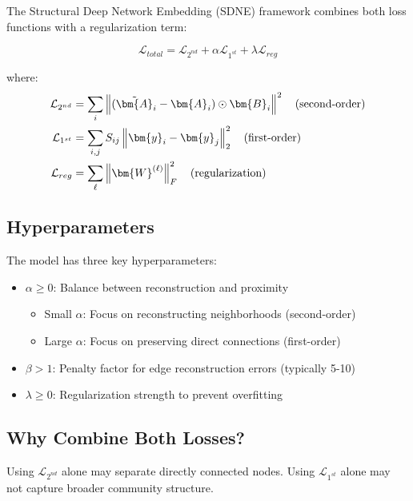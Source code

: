 \begin{notechapter}
The Structural Deep Network Embedding (SDNE) framework combines both loss functions with a regularization term:

\begin{equation}
\mathcal{L}_{total} = \mathcal{L}_{2^{nd}} + \alpha \mathcal{L}_{1^{st}} + \lambda \mathcal{L}_{reg}
\label{graph-autoencoders:eq:total_loss}
\end{equation}

where:
\begin{align}
\mathcal{L}_{2^{nd}} &= \sum_{i} \norm{(\tilde{\bm{A}}_i - \bm{A}_i) \hadamard \bm{B}_i}^2 \quad \text{(second-order)} \\
\mathcal{L}_{1^{st}} &= \sum_{i,j} S_{ij} \norm{\bm{y}_i - \bm{y}_j}^2_2 \quad \text{(first-order)} \\
\mathcal{L}_{reg} &= \sum_{\ell} \norm{\bm{W}^{(\ell)}}^2_F \quad \text{(regularization)}
\end{align}

\subsection{Hyperparameters}

The model has three key hyperparameters:

\begin{itemize}
    \item $\alpha \geq 0$: Balance between reconstruction and proximity
    \begin{itemize}
        \item Small $\alpha$: Focus on reconstructing neighborhoods (second-order)
        \item Large $\alpha$: Focus on preserving direct connections (first-order)
    \end{itemize}
    \item $\beta > 1$: Penalty factor for edge reconstruction errors (typically 5-10)
    \item $\lambda \geq 0$: Regularization strength to prevent overfitting
\end{itemize}

\subsection{Why Combine Both Losses?}

\begin{proposition}
Using $\mathcal{L}_{2^{nd}}$ alone may separate directly connected nodes. Using $\mathcal{L}_{1^{st}}$ alone may not capture broader community structure.
\end{proposition}


\end{notechapter}
